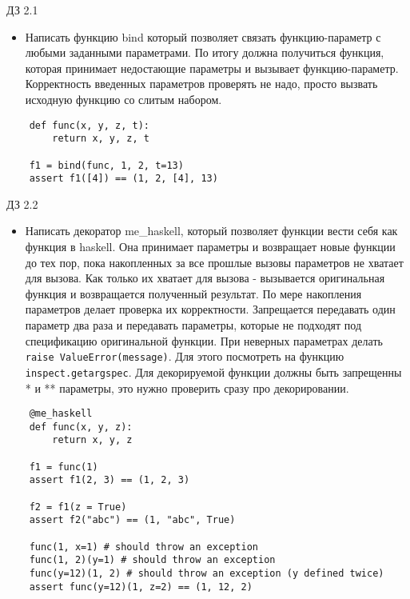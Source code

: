 \documentclass{article}
\begin{document}
\begin{center} ДЗ 2.1 \end{center}
\begin{itemize}
    \item Написать функцию bind который позволяет связать функцию-параметр с любыми заданными 
        параметрами. По итогу должна получиться функция, которая принимает недостающие параметры
        и вызывает функцию-параметр. Корректность введенных параметров проверять не надо, просто 
        вызвать исходную функцию со слитым набором.
\end{itemize}
\vspace{15pt}
\begin{lstlisting}
    def func(x, y, z, t):
        return x, y, z, t

    f1 = bind(func, 1, 2, t=13)
    assert f1([4]) == (1, 2, [4], 13)
\end{lstlisting}
\newpage

\begin{center} ДЗ 2.2 \end{center}
\begin{itemize}
    \item Написать декоратор me\_haskell, который позволяет функции вести себя как функция в haskell.
        Она принимает параметры и возвращает новые функции до тех пор, пока накопленных
        за все прошлые вызовы параметров не хватает для вызова. Как только их хватает для 
        вызова - вызывается оригинальная функция и возвращается полученный результат.
        По мере накопления параметров делает проверка их корректности. 
        Запрещается передавать один параметр два раза и передавать параметры, которые не 
        подходят под спецификацию оригинальной функции. При неверных параметрах
        делать \lstinline!raise ValueError(message)!. 
        Для этого посмотреть на функцию \lstinline!inspect.getargspec!.
        Для декорируемой функции должны быть запрещенны * и ** параметры, это
        нужно проверить сразу про декорировании.
\end{itemize}
\vspace{15pt}
\begin{lstlisting}
    @me_haskell
    def func(x, y, z):
        return x, y, z

    f1 = func(1)
    assert f1(2, 3) == (1, 2, 3)
    
    f2 = f1(z = True)
    assert f2("abc") == (1, "abc", True)

    func(1, x=1) # should throw an exception
    func(1, 2)(y=1) # should throw an exception
    func(y=12)(1, 2) # should throw an exception (y defined twice)
    assert func(y=12)(1, z=2) == (1, 12, 2)
\end{lstlisting}
\newpage
\end{document}
